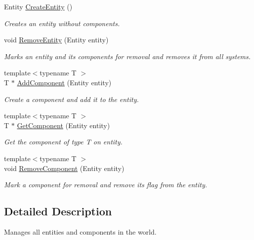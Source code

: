 \begin{DoxyCompactItemize}
\item 
Entity \hyperlink{class_e_c_s_1_1_entity_manager_a58a521f1a18027231d2895cf91a6b555}{Create\-Entity} ()
\begin{DoxyCompactList}\small\item\em Creates an entity without components. \end{DoxyCompactList}\item 
void \hyperlink{class_e_c_s_1_1_entity_manager_ae3c584bf9245a3dcbafc1cc5ea93b642}{Remove\-Entity} (Entity entity)
\begin{DoxyCompactList}\small\item\em Marks an entity and its components for removal and removes it from all systems. \end{DoxyCompactList}\item 
{\footnotesize template$<$typename T $>$ }\\T $\ast$ \hyperlink{class_e_c_s_1_1_entity_manager_a735ab328f07b45342c392fe1f1b6f925}{Add\-Component} (Entity entity)
\begin{DoxyCompactList}\small\item\em Create a component and add it to the entity. \end{DoxyCompactList}\item 
{\footnotesize template$<$typename T $>$ }\\T $\ast$ \hyperlink{class_e_c_s_1_1_entity_manager_a7ee27d400563107f222693fb103c21ed}{Get\-Component} (Entity entity)
\begin{DoxyCompactList}\small\item\em Get the component of type T on entity. \end{DoxyCompactList}\item 
{\footnotesize template$<$typename T $>$ }\\void \hyperlink{class_e_c_s_1_1_entity_manager_a78ee8abb53ca6a324496ea839503ac3f}{Remove\-Component} (Entity entity)
\begin{DoxyCompactList}\small\item\em Mark a component for removal and remove its flag from the entity. \end{DoxyCompactList}\end{DoxyCompactItemize}


\subsection{Detailed Description}
Manages all entities and components in the world. 


